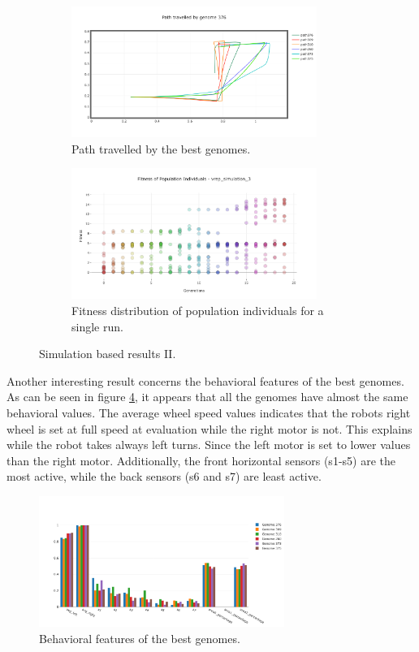 \begin{figure}[H]
    \centering
    \begin{subfigure}[b]{0.8\textwidth}
    	\centering
        \includegraphics[width=8cm]{include/images/sim_path_travelled.PNG}
        \caption{Path travelled by the best genomes.}
        \label{fig:sim_path_travelled}
    \end{subfigure}
    \begin{subfigure}[b]{0.8\textwidth}
    	\centering
        \includegraphics[width=8cm]{include/images/sim_fitness_distribution.PNG}
        \caption{Fitness distribution of population individuals for a single run.}
        \label{fig:sim_fitness_distribution}
    \end{subfigure}
    \caption{Simulation based results II.}
	\label{fig:sim_based_resultsII}
\end{figure}

Another interesting result concerns the behavioral features of the best genomes. As can be seen in figure \ref{fig:sim_behavioral_features_best}, it appears that all the genomes have almost the same behavioral values. The average wheel speed values indicates that the robots right wheel is set at full speed at evaluation while the right motor is not. This explains while the robot takes always left turns. Since the left motor is set to lower values than the right motor. Additionally, the front horizontal sensors (s1-s5) are the most active, while the back sensors (s6 and s7) are least active.

\begin{figure}[H]
    \centering
    \includegraphics[width=8cm]{include/images/sim_behavioral_features_best.PNG}
    \caption{Behavioral features of the best genomes.}
    \label{fig:sim_behavioral_features_best}
\end{figure}

